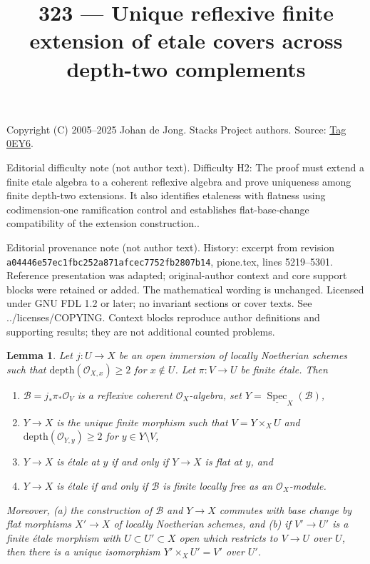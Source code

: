 \documentclass{amsart}
\theoremstyle{plain}
\newtheorem{lemma}[subsection]{Lemma}
\theoremstyle{definition}
\theoremstyle{remark}
\numberwithin{equation}{subsection}
\def\Spec{\mathop{\mathrm{Spec}}}
\begin{document}
\title[Stacks Project, Tag 0EY6]{323 --- Unique reflexive finite extension of etale covers across depth-two complements}
\maketitle
\noindent Copyright (C) 2005--2025 Johan de Jong. Stacks Project authors. Source: \href{https://stacks.math.columbia.edu/tag/0EY6}{Tag 0EY6}.

\noindent Editorial difficulty note (not author text). Difficulty H2: The proof must extend a finite etale algebra to a coherent reflexive algebra and prove uniqueness among finite depth-two extensions. It also identifies etaleness with flatness using codimension-one ramification control and establishes flat-base-change compatibility of the extension construction..

\noindent Editorial provenance note (not author text). History: excerpt from revision \texttt{a0444\allowbreak 6e57e\allowbreak c1fbc\allowbreak 252a8\allowbreak 71afc\allowbreak ec775\allowbreak 2fb28\allowbreak 07b14}, pione.tex, lines 5219--5301. Reference presentation was adapted; original-author context and core support blocks were retained or added. The mathematical wording is unchanged. Licensed under GNU FDL 1.2 or later; no invariant sections or cover texts. See ../licenses/COPYING. Context blocks reproduce author definitions and supporting results; they are not additional counted problems.

\begin{lemma}
\label{lemma-extend-S2}
Let $j : U \to X$ be an open immersion of locally Noetherian schemes
such that $\text{depth}(\mathcal{O}_{X, x}) \geq 2$ for $x \not \in U$.
Let $\pi : V \to U$ be finite \'etale. Then
\begin{enumerate}
\item $\mathcal{B} = j_*\pi_*\mathcal{O}_V$ is a reflexive coherent
$\mathcal{O}_X$-algebra, set $Y = \underline{\Spec}_X(\mathcal{B})$,
\item $Y \to X$ is the unique finite morphism such that
$V = Y \times_X U$ and $\text{depth}(\mathcal{O}_{Y, y}) \geq 2$
for $y \in Y \setminus V$,
\item $Y \to X$ is \'etale at $y$ if and only if $Y \to X$ is flat at $y$, and
\item $Y \to X$ is \'etale if and only if $\mathcal{B}$
is finite locally free as an $\mathcal{O}_X$-module.
\end{enumerate}
Moreover, (a) the construction of $\mathcal{B}$ and $Y \to X$ commutes
with base change by flat morphisms $X' \to X$ of locally Noetherian
schemes, and (b) if $V' \to U'$ is a finite \'etale morphism with
$U \subset U' \subset X$ open which restricts to $V \to U$ over $U$,
then there is a unique isomorphism $Y' \times_X U' = V'$ over $U'$.
\end{lemma}
\end{document}
